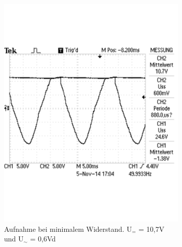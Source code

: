\documentclass[12pt,a4paper]{article}
\begin{document}
\begin{figure}[H]
        \centering
        \begin{subfigure}[b]{0.48\textwidth}
                \includegraphics[width=\textwidth , scale = 0.4]{2_4_1000F_1.pdf}
                \caption[Aufnahme bei minimalem Widerstand. U$_{=}$ = 10,7V und U$_\sim$ = 0,6V]{Aufnahme bei minimalem Widerstand. U$_{=}$ = 10,7V und U$_\sim$ = 0,6Vd}
 				 \label{fig:2_4_1000F_1}
        \end{subfigure}%
        \hfill
        \begin{subfigure}[b]{0.48\textwidth}

\end{subfigure}
\end{figure}
\end{document}
